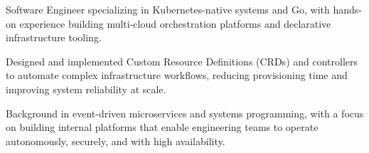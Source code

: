 
\begin{cvparagraph}

	Software Engineer specializing in Kubernetes-native systems and Go, 
	with hands-on experience building multi-cloud orchestration platforms and 
	declarative infrastructure tooling.

	Designed and implemented Custom Resource Definitions (CRDs) and controllers 
	to automate complex infrastructure workflows, reducing provisioning time and 
	improving system reliability at scale.

	Background in event-driven microservices and systems programming, with a focus 
	on building internal platforms that enable engineering teams to operate 
	autonomously, securely, and with high availability.
\end{cvparagraph}
